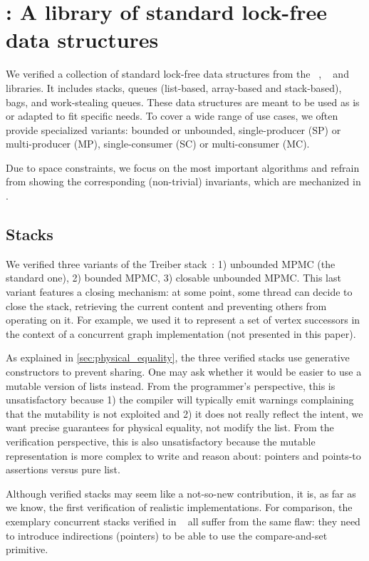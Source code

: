 \section{\Saturn: A library of standard lock-free data structures}
\label{sec:saturn}

We verified a collection of standard lock-free data structures from the \Saturn~\citep*{saturn}, \Eio~\citep*{eio} and \Picos~\citep*{picos} libraries.
It includes stacks, queues (list-based, array-based and stack-based), bags, and work-stealing queues.
These data structures are meant to be used as is or adapted to fit specific needs.
To cover a wide range of use cases, we often provide specialized variants: bounded or unbounded, single-producer (SP) or multi-producer (MP), single-consumer (SC) or multi-consumer (MC).

Due to space constraints, we focus on the most important algorithms and refrain from showing the corresponding (non-trivial) \Iris invariants, which are mechanized in \Rocq.

\subsection{Stacks}

We verified three variants of the Treiber stack~\citep*{thomas1986systems}: 1) unbounded MPMC (the standard one), 2) bounded MPMC, 3) closable unbounded MPMC.
This last variant features a closing mechanism: at some point, some thread can decide to close the stack, retrieving the current content and preventing others from operating on it.
For example, we used it to represent a set of vertex successors in the context of a concurrent graph implementation (not presented in this paper).

As explained in \cref{sec:physical_equality}, the three verified stacks use generative constructors to prevent sharing.
One may ask whether it would be easier to use a mutable version of lists instead.
From the programmer's perspective, this is unsatisfactory because 1) the compiler will typically emit warnings complaining that the mutability is not exploited and 2) it does not really reflect the intent, \ie we want precise guarantees for physical equality, not modify the list.
From the verification perspective, this is also unsatisfactory because the mutable representation is more complex to write and reason about: pointers and points-to assertions versus pure \Rocq list.

Although verified stacks may seem like a not-so-new contribution, it is, as far as we know, the first verification of realistic \OCaml implementations.
For comparison, the exemplary concurrent stacks verified in \Iris~\citep*{iris-examples} all suffer from the same flaw: they need to introduce indirections (pointers) to be able to use the compare-and-set primitive.

